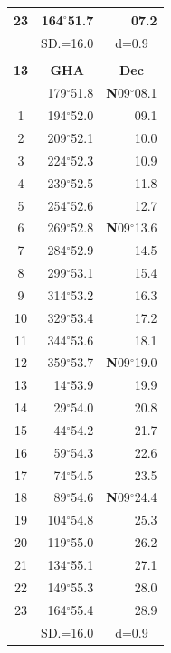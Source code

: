 \documentclass[10pt, a4paper]{report}
\begin{document}
\begin{scriptsize}
\begin{tabular*}{0.2\textwidth}[t]{@{\extracolsep{\fill}}|c|rr|}
23 & 164$^\circ$51.7 & 07.2\\
\hline
\rule{0pt}{2.4ex} & \multicolumn{1}{c}{SD.=16.0} & \multicolumn{1}{c|}{d=0.9}\\
\hline
\multicolumn{1}{c}{}\\[-0.5ex]\hline
\multicolumn{1}{|c|}{\rule{0pt}{2.6ex}\textbf{13}} & \multicolumn{1}{c}{\textbf{GHA}} & \multicolumn{1}{c|}{\textbf{Dec}}\\
\hline\rule{0pt}{2.6ex}\noindent
0 & 179$^\circ$51.8 & \textbf{N}09$^\circ$08.1\\
1 & 194$^\circ$52.0 & 09.1\\
2 & 209$^\circ$52.1 & 10.0\\
3 & 224$^\circ$52.3 & \raisebox{0.24ex}{\boldmath$\cdot$~\boldmath$\cdot$~~}10.9\\
4 & 239$^\circ$52.5 & 11.8\\
5 & 254$^\circ$52.6 & 12.7\\[2Pt]
6 & 269$^\circ$52.8 & \textbf{N}09$^\circ$13.6\\
7 & 284$^\circ$52.9 & 14.5\\
8 & 299$^\circ$53.1 & 15.4\\
9 & 314$^\circ$53.2 & \raisebox{0.24ex}{\boldmath$\cdot$~\boldmath$\cdot$~~}16.3\\
10 & 329$^\circ$53.4 & 17.2\\
11 & 344$^\circ$53.6 & 18.1\\[2Pt]
12 & 359$^\circ$53.7 & \textbf{N}09$^\circ$19.0\\
13 & 14$^\circ$53.9 & 19.9\\
14 & 29$^\circ$54.0 & 20.8\\
15 & 44$^\circ$54.2 & \raisebox{0.24ex}{\boldmath$\cdot$~\boldmath$\cdot$~~}21.7\\
16 & 59$^\circ$54.3 & 22.6\\
17 & 74$^\circ$54.5 & 23.5\\[2Pt]
18 & 89$^\circ$54.6 & \textbf{N}09$^\circ$24.4\\
19 & 104$^\circ$54.8 & 25.3\\
20 & 119$^\circ$55.0 & 26.2\\
21 & 134$^\circ$55.1 & \raisebox{0.24ex}{\boldmath$\cdot$~\boldmath$\cdot$~~}27.1\\
22 & 149$^\circ$55.3 & 28.0\\
23 & 164$^\circ$55.4 & 28.9\\
\hline
\rule{0pt}{2.4ex} & \multicolumn{1}{c}{SD.=16.0} & \multicolumn{1}{c|}{d=0.9}\\
\hline
\end{tabular*}\noindent

\end{scriptsize}
\end{document}

